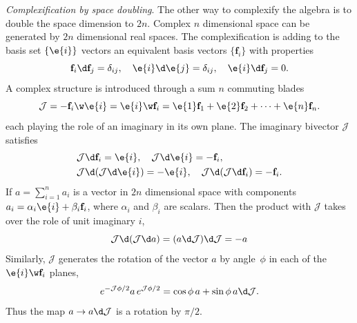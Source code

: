 %
\begin{unit}\textit{Complexification by space doubling}.
The other way  to complexify the algebra is to double the space
dimension to $2n$. Complex $n$ dimensional  space can be generated
by $2n$ dimensional real spaces. The complexification is adding to
the basis set $\{\e{i}\}$ vectors an equivalent  basis vectors
$\{\mathbf{f}_i\}$ with properties
\[\mathbf{f}_i\d\mathbf{f}_j=\delta_{ij},\quad\e{i}\d\e{j}=\delta_{ij},\quad\e{i}\d\mathbf{f}_{j}=0.
\]
A complex structure is introduced through a sum $n$ commuting
blades
\[\mathcal{J}=-\mathbf{f}_i\w\e{i}=\e{i}\w\mathbf{f}_i =\e{1}\mathbf{f}_1+\e{2}\mathbf{f}_2+\cdots +\e{n}\mathbf{f}_n.
\]
each playing the role of an imaginary in its own plane. The
imaginary bivector $\mathcal{J}$ satisfies
\[\begin{split}
&\mathcal{J}\d\mathbf{f}_i=\e{i},\quad\mathcal{J}\d\e{i}=-\mathbf{f}_i,\\
&\mathcal{J}\d(\mathcal{J}\d\e{i}) = -\e{i},\quad\mathcal{J}\d(\mathcal{J}\d\mathbf{f}_i)=-\mathbf{f}_i.\\
\end{split}\]
If $a=\sum_{i=1}^n a_i$ is a vector in $2n$ dimensional space with
components $a_i=\alpha_i\e{i}+\beta_i\mathbf{f}_i$, where
$\alpha_i$ and $\beta_i$ are scalars. Then the  product with
$\mathcal{J}$ takes over the role of unit imaginary $i$,
\[\mathcal{J}\d(\mathcal{J}\d a) =(a\d\mathcal{J})\d\mathcal{J}= -a\]
Similarly, $\mathcal{J}$  generates the rotation of the vector $a$
by angle~$\phi$ in each of  the $\e{i}\w\mathbf{f}_i$ planes,
\[e^{-\mathcal{J}\phi/2}a\, e^{\mathcal{J}\phi/2}=\cos\phi\, a+\sin\phi\, a\d\mathcal{J}.\]
Thus the map $a\rightarrow a\d\mathcal{J}$ is a  rotation by
$\pi/2$.
\end{unit}
%

